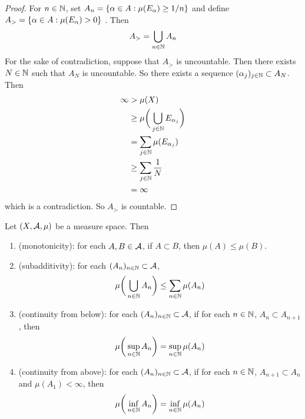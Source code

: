 \documentclass{book}
\begin{document}
	\begin{proof}
	For $n \in \mathbb{N}$, set $A_n = \{\alpha \in A: \mu(E_{\alpha}) \geq 1/n \}$ and define $ A_> = \{\alpha \in A: \mu(E_{\alpha}) >0\}$ . Then 
	$$A_> = \bigcup_{n \in \mathbb{N}}A_n$$
	For the sake of contradiction, suppose that 
	$A_>$ is uncountable. Then there exists $N \in \mathbb{N}$ such that $A_N$ is uncountable. So there exists a sequence $(\alpha_j)_{j \in \mathbb{N}} \subset A_N$. Then 
	\begin{align*}
	\infty 
	& > \mu(X) \\
	& \geq \mu \bigg( \bigcup_{j \in \mathbb{N}} E_{\alpha_{j}} \bigg) \\
	&= \sum_{j \in \mathbb{N}} \mu(E_{\alpha_j}) \\
	& \geq \sum_{j \in \mathbb{N}} \frac{1}{N} \\
	&= \infty
	\end{align*} 
	which is a contradiction. So $A_>$ is countable.
	\end{proof}
	
	\begin{ex} 
		Let $(X, \mathcal{A}, \mu)$ be a measure space. Then 
		\begin{enumerate}
			\item (monotonicity): for each $A,B \in \mathcal{A}$, if $A \subset B$, then $\mu(A) \leq \mu(B)$.
			\item (subadditivity): for each $(A_n)_{n \in \mathbb{N}} \subset \mathcal{A}$, $$\mu \bigg( \bigcup_{n \in \mathbb{N}} A_n \bigg) \leq \sum_{n \in \mathbb{N}}\mu(A_n)$$
			\item (continuity from below): for each $(A_n)_{n \in \mathbb{N}} \subset \mathcal{A}$, if for each $n \in \mathbb{N}$, $A_n \subset A_{n+1}$, then $$\mu\bigg(\sup_{n \in \mathbb{N}} A_n\bigg) = \sup_{n \in \mathbb{N}}\mu(A_n)$$
			\item (continuity from above): for each $(A_n)_{n \in \mathbb{N}} \subset \mathcal{A}$, if for each $n \in \mathbb{N}$, $ A_{n+1} \subset A_n$ and $\mu(A_1) < \infty$, then $$\mu\bigg(\inf_{n \in \mathbb{N}} A_n\bigg) = \inf_{n \in \mathbb{N}}\mu(A_n)$$
		\end{enumerate}
		
	\end{ex}
	
\end{document}
